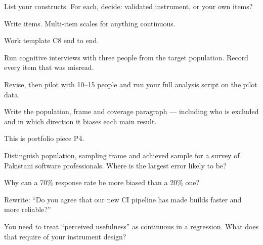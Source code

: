 \begin{lab}
\begin{tightnum}
  \item List your constructs. For each, decide: validated instrument, or your
    own items?
  \item Write items. Multi-item scales for anything continuous.
  \item Work template C8 end to end.
  \item Run cognitive interviews with three people from the target population.
    Record every item that was misread.
  \item Revise, then pilot with 10--15 people and run your full analysis script
    on the pilot data.
  \item Write the population, frame and coverage paragraph --- including who is
    excluded and in which direction it biases each main result.
\end{tightnum}

\medskip
This is portfolio piece P4.
\end{lab}

\begin{checkpoint}
\begin{tightnum}
  \item Distinguish population, sampling frame and achieved sample for a survey
    of Pakistani software professionals. Where is the largest error likely to
    be?
  \item Why can a 70\% response rate be more biased than a 20\% one?
  \item Rewrite: ``Do you agree that our new CI pipeline has made builds faster
    and more reliable?''
  \item You need to treat ``perceived usefulness'' as continuous in a
    regression. What does that require of your instrument design?
\end{tightnum}
\end{checkpoint}

